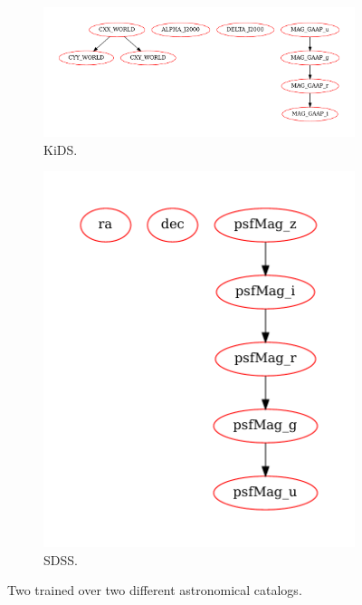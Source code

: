 \begin{figure}[htpb]
    \centering
    \begin{subfigure}[]{\textwidth}
    \includegraphics[width=\textwidth]{images/A2_prototypes/png_kids.pdf}
    \caption{\gls{KiDS}.}
    \end{subfigure}
    \begin{subfigure}[]{0.5\textwidth}
    \includegraphics[width=\textwidth]{images/A2_prototypes/png_sdss.pdf}
    \caption{\gls{SDSS}.}
    \end{subfigure}
    \caption{Two  trained over two different astronomical catalogs.}
    \label{fig:bayes1}
\end{figure}

